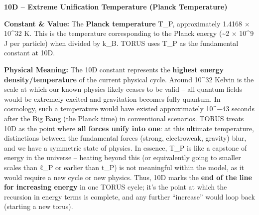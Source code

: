 \documentclass[]{article}
\begin{document}
\textbf{10D -- Extreme Unification Temperature (Planck Temperature)}

\textbf{Constant \& Value:} The \textbf{Planck temperature} T\_P,
approximately 1.4168 × 10\^{}32 K​. This is the temperature
corresponding to the Planck energy (\textasciitilde{}2 × 10\^{}9 J per
particle) when divided by k\_B. TORUS uses T\_P as the fundamental
constant at 10D.

\textbf{Physical Meaning:} The 10D constant represents the
\textbf{highest energy density/temperature} of the current physical
cycle. Around 10\^{}32 Kelvin is the scale at which our known physics
likely ceases to be valid -- all quantum fields would be extremely
excited and gravitation becomes fully quantum. In cosmology, such a
temperature would have existed approximately 10\^{}−43 seconds after the
Big Bang (the Planck time) in conventional scenarios. TORUS treats 10D
as the point where \textbf{all forces unify into one}: at this ultimate
temperature, distinctions between the fundamental forces (strong,
electroweak, gravity) blur, and we have a symmetric state of physics​.
In essence, T\_P is like a capstone of energy in the universe -- heating
beyond this (or equivalently going to smaller scales than ℓ\_P or
earlier than t\_P) is not meaningful within the model, as it would
require a new cycle or new physics. Thus, 10D marks the \textbf{end of
the line for increasing energy} in one TORUS cycle; it's the point at
which the recursion in energy terms is complete, and any further
``increase'' would loop back (starting a new torus).
\end{document}
